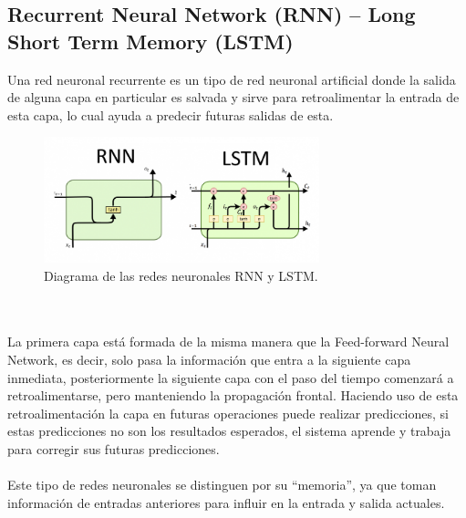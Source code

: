 \subsection{Recurrent Neural Network (RNN) – Long Short Term Memory (LSTM)}
Una red neuronal recurrente es un tipo de red neuronal artificial donde la salida de alguna capa en particular es salvada y sirve para retroalimentar la entrada de esta capa, lo cual ayuda a predecir futuras salidas de esta.
\begin{figure}[h]
	\centering
	\includegraphics[width=8cm]{figuras/RnnLstm.png}
	\caption{Diagrama de las redes neuronales RNN y LSTM.}
	\label{fig:Diagrama de las redes neuronales RNN y LSTM}
\end{figure}
\\\\La primera capa está formada de la misma manera que la Feed-forward Neural Network, es decir, solo pasa la información que entra a la siguiente capa inmediata, posteriormente la siguiente capa con el paso del tiempo comenzará a retroalimentarse, pero manteniendo la propagación frontal. Haciendo uso de esta retroalimentación la capa en futuras operaciones puede realizar predicciones, si estas predicciones no son los resultados esperados, el sistema aprende y trabaja para corregir sus futuras predicciones.\cite{redneurnn}\\\\
Este tipo de redes neuronales se distinguen por su “memoria”, ya que toman información de entradas anteriores para influir en la entrada y salida actuales.

